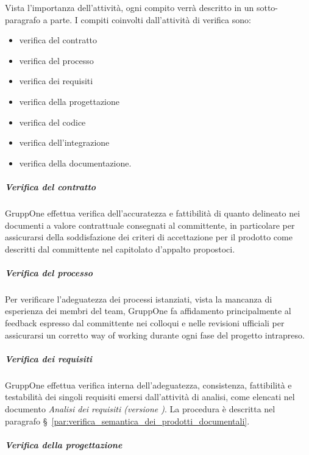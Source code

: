 \documentclass[../../norme-di-progetto.tex]{subfiles}
\begin{document}
Vista l'importanza dell'attività, ogni compito verrà descritto in un sotto-paragrafo a parte. I compiti coinvolti dall'attività di verifica sono:

\begin{itemize}
  \item verifica del contratto
  \item verifica del processo
  \item verifica dei requisiti
  \item verifica della progettazione
  \item verifica del codice
  \item verifica dell'integrazione
  \item verifica della documentazione.
\end{itemize}

\subparagraph{Verifica del contratto}%
\label{subp:verifica_del_contratto}

GruppOne effettua verifica dell'accuratezza e fattibilità di quanto delineato nei documenti a valore contrattuale consegnati al committente, in particolare per assicurarsi della soddisfazione dei criteri di accettazione per il prodotto come descritti dal committente nel capitolato d'appalto propostoci.


\subparagraph{Verifica del processo}%
\label{subp:verifica_del_processo}

Per verificare l'adeguatezza dei processi istanziati, vista la mancanza di esperienza dei membri del team, GruppOne fa affidamento principalmente al feedback espresso dal committente nei colloqui e nelle revisioni ufficiali per assicurarsi un corretto way of working durante ogni fase del progetto intrapreso.


\subparagraph{Verifica dei requisiti}%
\label{subp:verifica_dei_requisiti}

GruppOne effettua verifica interna dell'adeguatezza, consistenza, fattibilità e testabilità dei singoli requisiti emersi dall'attività di analisi, come elencati nel documento \textit{Analisi dei requisiti (versione \versione)}.
La procedura è descritta nel paragrafo §~\ref{par:verifica_semantica_dei_prodotti_documentali}.


\subparagraph{Verifica della progettazione}%
\label{subp:verifica_della_progettazione}
\end{document}
